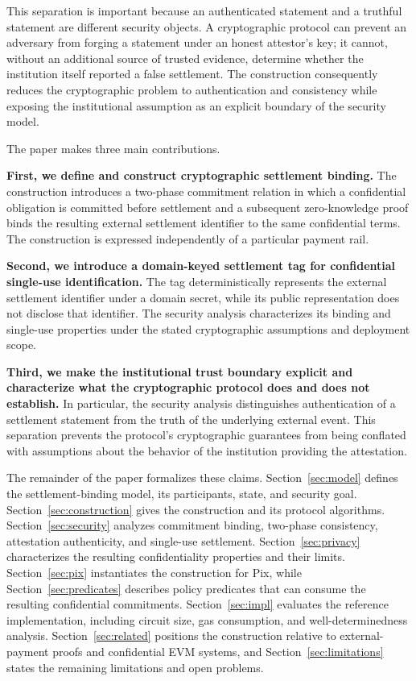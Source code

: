 \documentclass[10pt,twocolumn]{article}
\begin{document}
This separation is important because an authenticated statement and a
truthful statement are different security objects. A cryptographic
protocol can prevent an adversary from forging a statement under an
honest attestor's key; it cannot, without an additional source of trusted
evidence, determine whether the institution itself reported a false
settlement. The construction consequently reduces the cryptographic
problem to authentication and consistency while exposing the
institutional assumption as an explicit boundary of the security model.

The paper makes three main contributions.

\textbf{First, we define and construct cryptographic settlement binding.}
The construction introduces a two-phase commitment relation in which a
confidential obligation is committed before settlement and a subsequent
zero-knowledge proof binds the resulting external settlement identifier
to the same confidential terms. The construction is expressed
independently of a particular payment rail.

\textbf{Second, we introduce a domain-keyed settlement tag for
confidential single-use identification.} The tag deterministically
represents the external settlement identifier under a domain secret,
while its public representation does not disclose that identifier. The
security analysis characterizes its binding and single-use properties
under the stated cryptographic assumptions and deployment scope.

\textbf{Third, we make the institutional trust boundary explicit and
characterize what the cryptographic protocol does and does not
establish.} In particular, the security analysis distinguishes
authentication of a settlement statement from the truth of the underlying
external event. This separation prevents the protocol's cryptographic
guarantees from being conflated with assumptions about the behavior of
the institution providing the attestation.

The remainder of the paper formalizes these claims. Section~\ref{sec:model}
defines the settlement-binding model, its participants, state, and
security goal. Section~\ref{sec:construction} gives the construction and
its protocol algorithms. Section~\ref{sec:security} analyzes commitment
binding, two-phase consistency, attestation authenticity, and single-use
settlement. Section~\ref{sec:privacy} characterizes the resulting
confidentiality properties and their limits. Section~\ref{sec:pix}
instantiates the construction for Pix, while Section~\ref{sec:predicates}
describes policy predicates that can consume the resulting confidential
commitments. Section~\ref{sec:impl} evaluates the reference
implementation, including circuit size, gas consumption, and
well-determinedness analysis. Section~\ref{sec:related} positions the
construction relative to external-payment proofs and confidential EVM
systems, and Section~\ref{sec:limitations} states the remaining
limitations and open problems.
\end{document}
